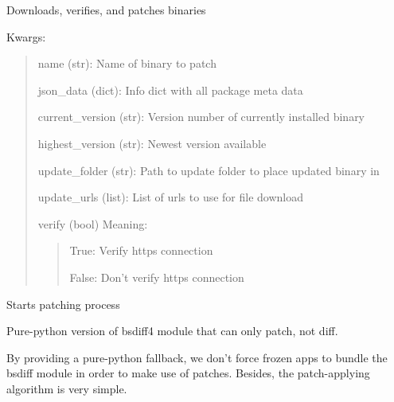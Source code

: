 \documentclass[letterpaper,10pt,english]{sphinxmanual}
\begin{document}
\begin{fulllineitems}
\label{api:pyi_updater.patcher.Patcher}
Downloads, verifies, and patches binaries

Kwargs:
\begin{quote}

name (str): Name of binary to patch

json\_data (dict): Info dict with all package meta data

current\_version (str): Version number of currently installed binary

highest\_version (str): Newest version available

update\_folder (str): Path to update folder to place updated binary in

update\_urls (list): List of urls to use for file download

verify (bool) Meaning:
\begin{quote}

True: Verify https connection

False: Don't verify https connection
\end{quote}
\end{quote}

\begin{fulllineitems}
\label{api:pyi_updater.patcher.Patcher.start}
Starts patching process

\end{fulllineitems}


\end{fulllineitems}

\label{api:module-pyi_updater.utils}

\begin{fulllineitems}
\label{api:pyi_updater.utils.bsdiff4_py}
Pure-python version of bsdiff4 module that can only patch, not diff.

By providing a pure-python fallback, we don't force frozen apps to
bundle the bsdiff module in order to make use of patches.  Besides,
the patch-applying algorithm is very simple.

\end{fulllineitems}
\end{document}
